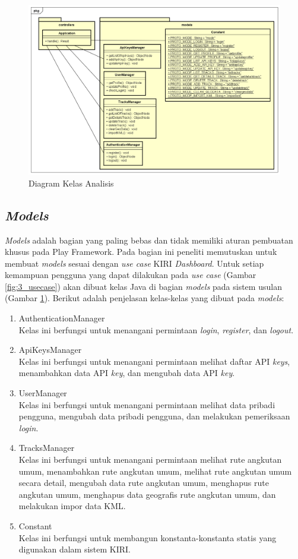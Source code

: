 \begin{figure}[htbp]
	\centering
		\includegraphics[scale=0.47]{Gambar/3_classdiagram_kasar.png}
	\caption{Diagram Kelas Analisis}
	\label{fig:3_classdiagram_kasar}
\end{figure}


\subsection{\textit{Models}}
\label{sec:modelusulan}
\textit{Models} adalah bagian yang paling bebas dan tidak memiliki aturan pembuatan khusus pada Play Framework. Pada bagian ini peneliti memutuskan untuk membuat \textit{models} sesuai dengan \textit{use case} KIRI \textit{Dashboard}. Untuk setiap kemampuan pengguna yang dapat dilakukan pada \textit{use case} (Gambar \ref{fig:3_usecase}) akan dibuat kelas Java di bagian \textit{models} pada sistem usulan (Gambar \ref{fig:3_classdiagram_kasar}). Berikut adalah penjelasan kelas-kelas yang dibuat pada \textit{models}:
\begin{enumerate}
	\item AuthenticationManager\\
	Kelas ini berfungsi untuk menangani permintaan \textit{login}, \textit{register}, dan \textit{logout}.
	\item ApiKeysManager\\
	Kelas ini berfungsi untuk menangani permintaan melihat daftar API \textit{keys}, menambahkan data API \textit{key}, dan mengubah data API \textit{key}.
	\item UserManager\\
	Kelas ini berfungsi untuk menangani permintaan melihat data pribadi pengguna, mengubah data pribadi pengguna, dan melakukan pemeriksaan \textit{login}.
	\item TracksManager\\
	Kelas ini berfungsi untuk menangani permintaan melihat rute angkutan umum, menambahkan rute angkutan umum, melihat rute angkutan umum secara detail, mengubah data rute angkutan umum, menghapus rute angkutan umum, menghapus data geografis rute angkutan umum, dan melakukan impor data KML.
	\item Constant\\
	Kelas ini berfungsi untuk membangun konstanta-konstanta statis yang digunakan dalam sistem KIRI.
\end{enumerate}


